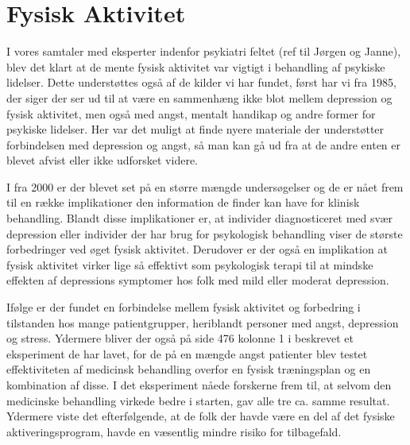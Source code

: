 \section{Fysisk Aktivitet}
I vores samtaler med eksperter indenfor psykiatri feltet (ref til Jørgen og Janne), blev det klart at de mente fysisk aktivitet var vigtigt i behandling af psykiske lidelser.
Dette understøttes også af de kilder vi har fundet, først har vi \citet{misc:healthReports} fra 1985, der siger der ser ud til at være en sammenhæng ikke blot mellem depression og fysisk aktivitet, men også med angst, mentalt handikap og andre former for psykiske lidelser.
Her var det muligt at finde nyere materiale der understøtter forbindelsen med depression og angst, så man kan gå ud fra at de andre enten er blevet afvist eller ikke udforsket videre.

I \citet{art:physMental} fra 2000 er der blevet set på en større mængde undersøgelser og de er nået frem til en række implikationer den information de finder kan have for klinisk behandling.
Blandt disse implikationer er, at individer diagnosticeret med svær depression eller individer der har brug for psykologisk behandling viser de største forbedringer ved øget fysisk aktivitet.
Derudover er der også en implikation at fysisk aktivitet virker lige så effektivt som psykologisk terapi til at mindske effekten af depressions symptomer hos folk med mild eller moderat depression.

Ifølge \citet{book:sportPsyc} er der fundet en forbindelse mellem fysisk aktivitet og forbedring i tilstanden hos mange patientgrupper, heriblandt personer med angst, depression og stress.
Ydermere bliver der også på side 476 kolonne 1 i \citet{book:sportPsyc} beskrevet et eksperiment de har lavet, for de på en mængde angst patienter blev testet effektiviteten af medicinsk behandling overfor en fysisk træningsplan og en kombination af disse.
I det eksperiment nåede forskerne frem til, at selvom den medicinske behandling virkede bedre i starten, gav alle tre ca. samme resultat.
Ydermere viste det efterfølgende, at de folk der havde være en del af det fysiske aktiveringsprogram, havde en væsentlig mindre risiko for tilbagefald.

